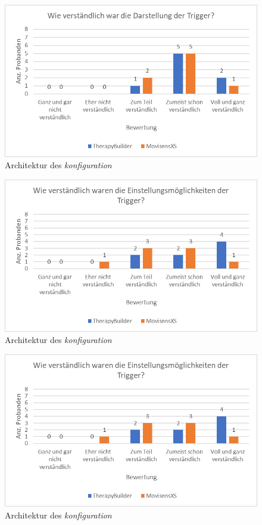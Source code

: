 \begin{figure}[h]
\centering
\includegraphics[width=1\textwidth]{pictures/diagramme/triggerdarstellung}
\caption{Architektur des \emph{konfiguration}}
\label{therapyBuilder}
\end{figure}

\begin{figure}[h]
\centering
\includegraphics[width=1\textwidth]{pictures/diagramme/triggereinstellung}
\caption{Architektur des \emph{konfiguration}}
\label{therapyBuilder}
\end{figure}

\begin{figure}[h]
\centering
\includegraphics[width=1\textwidth]{pictures/diagramme/triggereinstellung}
\caption{Architektur des \emph{konfiguration}}
\label{therapyBuilder}
\end{figure}

